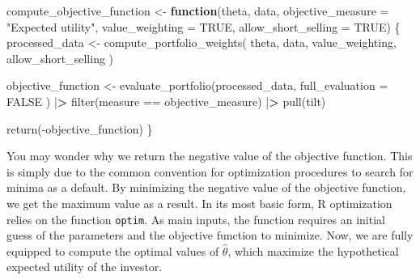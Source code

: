 \documentclass[
]{krantz}
\newenvironment{Shaded}{\begin{snugshade}}{\end{snugshade}}
\newcommand{\AttributeTok}[1]{\textcolor[rgb]{0.61,0.61,0.61}{#1}}
\newcommand{\ConstantTok}[1]{\textcolor[rgb]{0,0,0}{#1}}
\newcommand{\ControlFlowTok}[1]{\textcolor[rgb]{0.27,0.27,0.27}{\textbf{#1}}}
\newcommand{\ErrorTok}[1]{\textcolor[rgb]{0.14,0.14,0.14}{\textbf{#1}}}
\newcommand{\FunctionTok}[1]{\textcolor[rgb]{0,0,0}{#1}}
\newcommand{\NormalTok}[1]{#1}
\newcommand{\OtherTok}[1]{\textcolor[rgb]{0.37,0.37,0.37}{#1}}
\newcommand{\SpecialCharTok}[1]{\textcolor[rgb]{0,0,0}{#1}}
\newcommand{\StringTok}[1]{\textcolor[rgb]{0.5,0.5,0.5}{#1}}
\begin{document}
\begin{Shaded}
\begin{Highlighting}[]
\NormalTok{compute\_objective\_function }\OtherTok{\textless{}{-}} \ControlFlowTok{function}\NormalTok{(theta,}
\NormalTok{                                       data,}
                                       \AttributeTok{objective\_measure =} \StringTok{"Expected utility"}\NormalTok{,}
                                       \AttributeTok{value\_weighting =} \ConstantTok{TRUE}\NormalTok{,}
                                       \AttributeTok{allow\_short\_selling =} \ConstantTok{TRUE}\NormalTok{) \{}
\NormalTok{  processed\_data }\OtherTok{\textless{}{-}} \FunctionTok{compute\_portfolio\_weights}\NormalTok{(}
\NormalTok{    theta,}
\NormalTok{    data,}
\NormalTok{    value\_weighting,}
\NormalTok{    allow\_short\_selling}
\NormalTok{  )}

\NormalTok{  objective\_function }\OtherTok{\textless{}{-}} \FunctionTok{evaluate\_portfolio}\NormalTok{(processed\_data,}
    \AttributeTok{full\_evaluation =} \ConstantTok{FALSE}
\NormalTok{  ) }\SpecialCharTok{|}\ErrorTok{\textgreater{}}
    \FunctionTok{filter}\NormalTok{(measure }\SpecialCharTok{==}\NormalTok{ objective\_measure) }\SpecialCharTok{|}\ErrorTok{\textgreater{}}
    \FunctionTok{pull}\NormalTok{(tilt)}

  \FunctionTok{return}\NormalTok{(}\SpecialCharTok{{-}}\NormalTok{objective\_function)}
\NormalTok{\}}
\end{Highlighting}
\end{Shaded}

You may wonder why we return the negative value of the objective function. This is simply due to the common convention for optimization procedures to search for minima as a default. By minimizing the negative value of the objective function, we get the maximum value as a result.
In its most basic form, R optimization relies on the function \texttt{optim}. As main inputs, the function requires an initial guess of the parameters and the objective function to minimize. Now, we are fully equipped to compute the optimal values of \(\hat\theta\), which maximize the hypothetical expected utility of the investor.

\begin{Shaded}
\end{Shaded}
\end{document}
